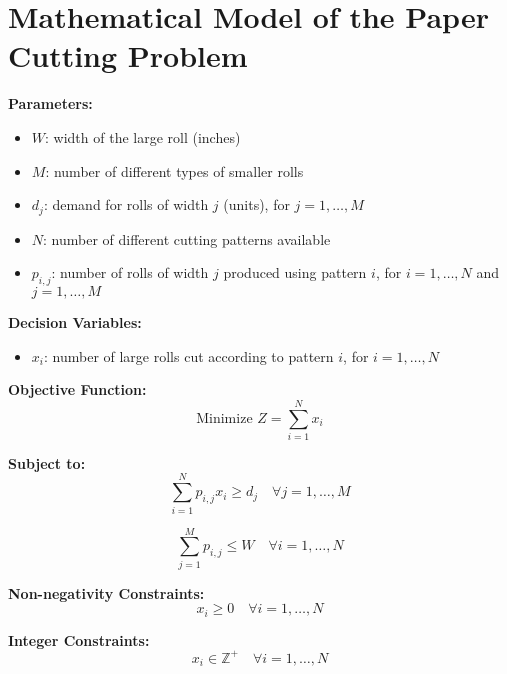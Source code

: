 \documentclass{article}
\begin{document}
\section*{Mathematical Model of the Paper Cutting Problem}

\textbf{Parameters:}
\begin{itemize}
    \item $W$: width of the large roll (inches)
    \item $M$: number of different types of smaller rolls
    \item $d_j$: demand for rolls of width $j$ (units), for $j=1, \ldots, M$
    \item $N$: number of different cutting patterns available
    \item $p_{i,j}$: number of rolls of width $j$ produced using pattern $i$, for $i=1, \ldots, N$ and $j=1, \ldots, M$
\end{itemize}

\textbf{Decision Variables:}
\begin{itemize}
    \item $x_i$: number of large rolls cut according to pattern $i$, for $i=1, \ldots, N$
\end{itemize}

\textbf{Objective Function:}
\[
\text{Minimize } Z = \sum_{i=1}^{N} x_i
\]

\textbf{Subject to:}
\begin{equation}
\sum_{i=1}^{N} p_{i,j} x_i \geq d_j \quad \forall j = 1, \ldots, M
\end{equation}

\begin{equation}
\sum_{j=1}^{M} p_{i,j} \leq W \quad \forall i = 1, \ldots, N
\end{equation}

\textbf{Non-negativity Constraints:}
\[
x_i \geq 0 \quad \forall i = 1, \ldots, N
\]

\textbf{Integer Constraints:}
\[
x_i \in \mathbb{Z}^+ \quad \forall i = 1, \ldots, N
\]
\end{document}
